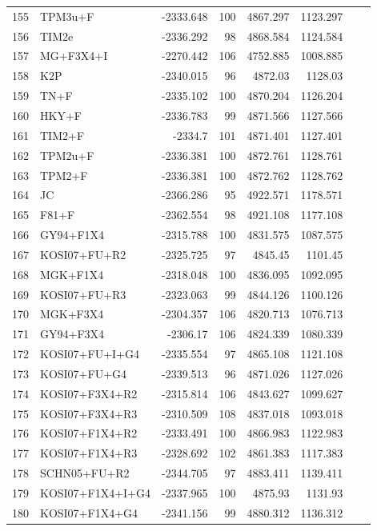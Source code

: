 \documentclass[fleqn,letterpaper]{article}
\begin{document}
\begin{longtable}{clrrrrrr}
	155 & TPM3u+F & -2333.648 & 100 & 4867.297 & 1123.297 \\ 
	156 & TIM2e & -2336.292 & 98 & 4868.584 & 1124.584 \\ 
	157 & MG+F3X4+I & -2270.442 & 106 & 4752.885 & 1008.885 \\ 
	158 & K2P & -2340.015 & 96 & 4872.03 & 1128.03 \\ 
	159 & TN+F & -2335.102 & 100 & 4870.204 & 1126.204 \\ 
	160 & HKY+F & -2336.783 & 99 & 4871.566 & 1127.566 \\ 
	161 & TIM2+F & -2334.7 & 101 & 4871.401 & 1127.401 \\ 
	162 & TPM2u+F & -2336.381 & 100 & 4872.761 & 1128.761 \\ 
	163 & TPM2+F & -2336.381 & 100 & 4872.762 & 1128.762 \\ 
	164 & JC & -2366.286 & 95 & 4922.571 & 1178.571 \\ 
	165 & F81+F & -2362.554 & 98 & 4921.108 & 1177.108 \\ 
	166 & GY94+F1X4 & -2315.788 & 100 & 4831.575 & 1087.575 \\ 
	167 & KOSI07+FU+R2 & -2325.725 & 97 & 4845.45 & 1101.45 \\ 
	168 & MGK+F1X4 & -2318.048 & 100 & 4836.095 & 1092.095 \\ 
	169 & KOSI07+FU+R3 & -2323.063 & 99 & 4844.126 & 1100.126 \\ 
	170 & MGK+F3X4 & -2304.357 & 106 & 4820.713 & 1076.713 \\ 
	171 & GY94+F3X4 & -2306.17 & 106 & 4824.339 & 1080.339 \\ 
	172 & KOSI07+FU+I+G4 & -2335.554 & 97 & 4865.108 & 1121.108 \\ 
	173 & KOSI07+FU+G4 & -2339.513 & 96 & 4871.026 & 1127.026 \\ 
	174 & KOSI07+F3X4+R2 & -2315.814 & 106 & 4843.627 & 1099.627 \\ 
	175 & KOSI07+F3X4+R3 & -2310.509 & 108 & 4837.018 & 1093.018 \\ 
	176 & KOSI07+F1X4+R2 & -2333.491 & 100 & 4866.983 & 1122.983 \\ 
	177 & KOSI07+F1X4+R3 & -2328.692 & 102 & 4861.383 & 1117.383 \\ 
	178 & SCHN05+FU+R2 & -2344.705 & 97 & 4883.411 & 1139.411 \\ 
	179 & KOSI07+F1X4+I+G4 & -2337.965 & 100 & 4875.93 & 1131.93 \\ 
	180 & KOSI07+F1X4+G4 & -2341.156 & 99 & 4880.312 & 1136.312 \\ 

\end{longtable}
\end{document}
